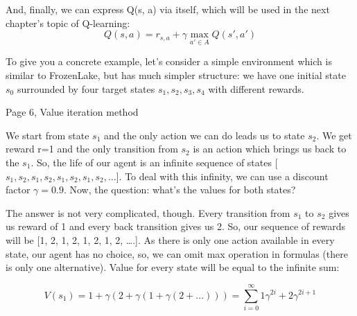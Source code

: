 And, finally, we can express Q(s, a) via itself, which will be used in the next chapter’s topic of Q-learning:
\begin{equation*}
Q(s,a)=r_{s,a} + \gamma \max_{a' \in A}Q(s',a')
\end{equation*}

To give you a concrete example, let’s consider a simple environment which is
similar to FrozenLake, but has much simpler structure: we have one initial state
\begin{math}s_0\end{math} surrounded by four target states \begin{math}s_1, s_2, s_3, s_4\end{math} with different rewards.

Page 6, Value iteration method

We start from state \begin{math}s_1\end{math} and the only action we can do leads us to state \begin{math}s_2\end{math}. We
get reward r=1 and the only transition from \begin{math}s_2\end{math} is an action which brings us back
to the \begin{math}s_1\end{math}. So, the life of our agent is an infinite sequence of states [
\begin{math}s_1, s_2, s_1, s_2, s_1, s_2, s_1, s_2,\ldots\end{math}]. To deal with this infinity, we can use a discount
factor \begin{math}\gamma=0.9\end{math}. Now, the question: what’s the values for both states?

The answer is not very complicated, though. Every transition from \begin{math}s_1\end{math} to \begin{math}s_2\end{math} gives
us reward of 1 and every back transition gives us 2. So, our sequence of rewards
will be [1, 2, 1, 2, 1, 2, 1, 2, ….]. As there is only one action available in
every state, our agent has no choice, so, we can omit max operation in formulas
(there is only one alternative). Value for every state will be equal to the
infinite sum:


\begin{equation*}
V(s_1) = 1 + \gamma (2 + \gamma(1 + \gamma(2 + \ldots))) = \sum_{i=0}^\infty 1\gamma^{2i}+2\gamma^{2i+1}
\end{equation*}


